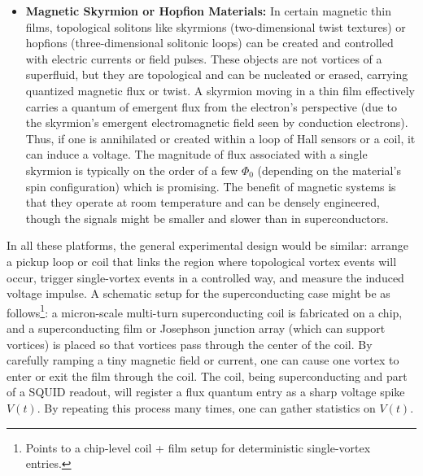 \documentclass[12pt]{article}
\begin{document}
\begin{itemize}
\item 
\textbf{Magnetic Skyrmion or Hopfion Materials:} In certain magnetic thin films, topological solitons like skyrmions (two-dimensional twist textures) or hopfions (three-dimensional solitonic loops) can be created and controlled with electric currents or field pulses. These objects are not vortices of a superfluid, but they are topological and can be nucleated or erased, carrying quantized magnetic flux or twist. A skyrmion moving in a thin film effectively carries a quantum of emergent flux from the electron's perspective (due to the skyrmion’s emergent electromagnetic field seen by conduction electrons). Thus, if one is annihilated or created within a loop of Hall sensors or a coil, it can induce a voltage. The magnitude of flux associated with a single skyrmion is typically on the order of a few $\Phi_{0}$ (depending on the material’s spin configuration) which is promising. The benefit of magnetic systems is that they operate at room temperature and can be densely engineered, though the signals might be smaller and slower than in superconductors.




\end{itemize}




In all these platforms, the general experimental design would be similar: arrange a pickup loop or coil that links the region where topological vortex events will occur, trigger single-vortex events in a controlled way, and measure the induced voltage impulse. A schematic setup for the superconducting case might be as follows\footnote{Points to a chip-level coil + film setup for deterministic single-vortex entries.}: a micron-scale multi-turn superconducting coil is fabricated on a chip, and a superconducting film or Josephson junction array (which can support vortices) is placed so that vortices pass through the center of the coil. By carefully ramping a tiny magnetic field or current, one can cause one vortex to enter or exit the film through the coil. The coil, being superconducting and part of a SQUID readout, will register a flux quantum entry as a sharp voltage spike $V(t)$. By repeating this process many times, one can gather statistics on $V(t)$.
\end{document}
